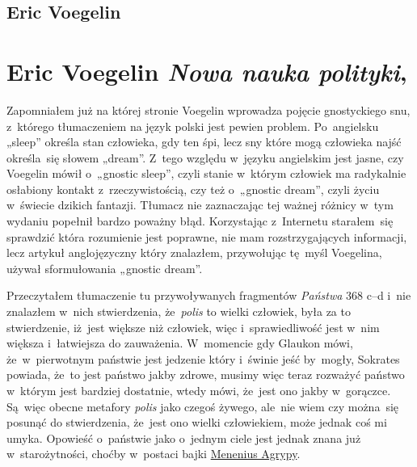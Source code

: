 \documentclass[a4paper,11pt]{article}
\numberwithin{equation}{section}
\begin{document}
\newpage

\subsection{Eric Voegelin}

\VerSpaceTwo



\section{Eric Voegelin \textit{Nowa nauka polityki},
  \cite{VoegelinNowaNaukaPolityki1992}}


\vspace{0em}



\vspace{0em}


\noindent
Zapomniałem już na której stronie Voegelin wprowadza pojęcie gnostyckiego
snu, z~którego tłumaczeniem na język polski jest pewien problem.
Po~angielsku „sleep” określa stan człowieka, gdy ten śpi, lecz sny
które mogą człowieka najść określa~się słowem „dream”. Z~tego
względu w~języku angielskim jest jasne, czy Voegelin mówił o~„gnostic
sleep”, czyli stanie w~którym człowiek ma radykalnie osłabiony
kontakt z~rzeczywistością, czy też o~„gnostic dream”, czyli życiu
w~świecie dzikich fantazji. Tłumacz nie zaznaczając tej ważnej różnicy
w~tym wydaniu popełnił bardzo poważny błąd. Korzystając z~Internetu
starałem~się sprawdzić która rozumienie jest poprawne, nie mam
rozstrzygających informacji, lecz artykuł anglojęzyczny który
znalazłem, przywołując tę~myśl Voegelina, używał sformułowania
„gnostic dream”.

\VerSpaceFour







\noindent
{} Przeczytałem tłumaczenie tu przywoływanych fragmentów
\textit{Państwa} 368 c--d i~nie znalazłem w~nich stwierdzenia,
że~\textit{polis} to wielki człowiek, była za to stwierdzenie,
iż~jest większe niż człowiek, więc i~sprawiedliwość jest
w~nim większa i~łatwiejsza do zauważenia. W~momencie gdy Glaukon mówi,
że~w~pierwotnym państwie jest jedzenie który i~świnie jeść by~mogły,
Sokrates powiada, że~to jest państwo jakby zdrowe, musimy więc teraz
rozważyć państwo w~którym jest bardziej dostatnie, wtedy mówi, że~jest
ono jakby w~gorączce. Są~więc obecne metafory \textit{polis} jako czegoś
żywego, ale~nie wiem czy można~się posunąć do stwierdzenia, że~jest
ono wielki człowiekiem, może jednak coś mi umyka. Opowieść o~państwie
jako o~jednym ciele jest jednak znana już w~starożytności, choćby
w~postaci bajki
\href{https://en.wikipedia.org/wiki/Agrippa_Menenius_Lanatus_(consul_503_BC)}
{Menenius Agrypy}.
\end{document}
